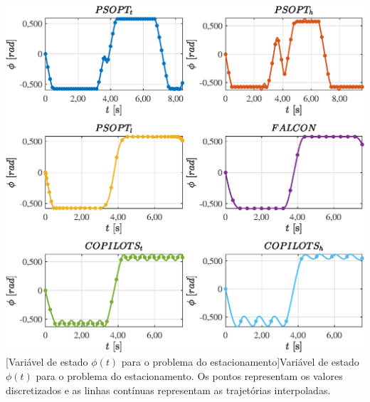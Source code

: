 \noindent
\begin{minipage}{\textwidth}
	\vspace{\onelineskip}
	\centering
	\includegraphics[scale=0.7]{fig/resultados/estacionamento/traj/x/phi}
	[Variável de estado $\phi(t)$ para o problema do estacionamento]{Variável de estado $\phi(t)$ para o problema do estacionamento. Os pontos representam os valores discretizados e as linhas contínuas representam as trajetórias interpoladas.}
	\label{fig:estacionamento:x:phi}
	\vspace{\onelineskip}
\end{minipage}

